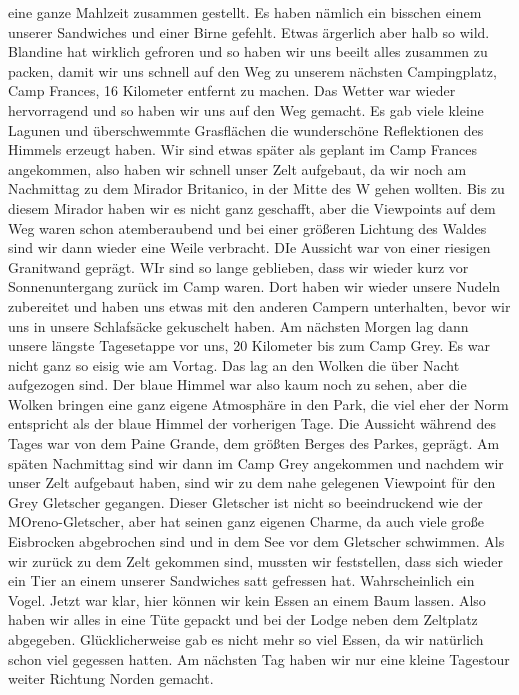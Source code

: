 \documentclass[11pt]{book}
\begin{document}
eine ganze Mahlzeit zusammen gestellt. Es haben nämlich ein bisschen einem unserer Sandwiches und einer Birne gefehlt. Etwas ärgerlich 
aber halb so wild. Blandine hat wirklich gefroren und so haben wir uns beeilt alles zusammen zu packen, damit wir uns schnell auf den Weg 
zu unserem nächsten Campingplatz, Camp Frances, 16 Kilometer entfernt zu machen. Das Wetter war wieder hervorragend und so haben wir 
uns auf den Weg gemacht. Es gab viele kleine Lagunen und überschwemmte Grasflächen die wunderschöne Reflektionen des Himmels erzeugt haben. 
Wir sind etwas später als geplant im Camp Frances angekommen, also haben wir schnell unser Zelt aufgebaut, da wir noch am Nachmittag 
zu dem Mirador Britanico, in der Mitte des W gehen wollten. Bis zu diesem Mirador haben wir es nicht ganz geschafft, aber die  Viewpoints 
auf dem Weg waren schon atemberaubend und bei einer größeren Lichtung des Waldes sind wir dann wieder eine Weile verbracht. DIe Aussicht 
war von einer riesigen Granitwand geprägt. WIr sind so lange geblieben, dass wir wieder kurz vor Sonnenuntergang zurück im Camp waren. 
Dort haben wir wieder unsere Nudeln zubereitet und haben uns etwas mit den anderen Campern unterhalten, bevor wir uns in unsere 
Schlafsäcke gekuschelt haben. 
Am nächsten Morgen lag dann unsere längste Tagesetappe vor uns, 20 Kilometer bis zum Camp Grey. Es war nicht ganz so eisig wie am Vortag. 
Das lag an den Wolken die über Nacht aufgezogen sind. Der blaue Himmel war also kaum noch zu sehen, aber die Wolken bringen eine ganz 
eigene Atmosphäre in den Park, die viel eher der Norm entspricht als der blaue Himmel der vorherigen Tage. Die Aussicht während des Tages 
war von dem Paine Grande, dem größten Berges des Parkes, geprägt. Am späten Nachmittag sind wir dann im Camp Grey angekommen und nachdem 
wir unser Zelt aufgebaut haben, sind wir zu dem nahe gelegenen Viewpoint für den Grey Gletscher gegangen. Dieser Gletscher ist nicht 
so beeindruckend wie der MOreno-Gletscher, aber hat seinen ganz eigenen Charme, da auch viele große Eisbrocken abgebrochen sind und 
in dem See vor dem Gletscher schwimmen. Als wir zurück zu dem Zelt gekommen sind, mussten wir feststellen, dass sich wieder ein Tier 
an einem unserer Sandwiches satt gefressen hat. Wahrscheinlich ein Vogel. Jetzt war klar, hier können wir kein Essen an einem Baum lassen. 
Also haben wir alles in eine Tüte gepackt und bei der Lodge neben dem Zeltplatz abgegeben. Glücklicherweise gab es nicht mehr so 
viel Essen, da wir natürlich schon viel gegessen hatten. Am nächsten Tag haben wir nur eine kleine Tagestour weiter Richtung Norden gemacht. 
\end{document}
